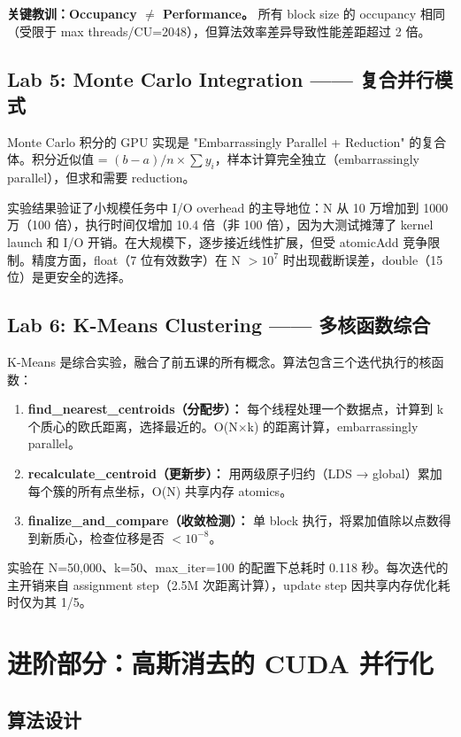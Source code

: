 \documentclass[a4paper]{article}
\begin{document}
\textbf{关键教训：Occupancy $\neq$ Performance。} 所有 block size 的 occupancy 相同（受限于 max threads/CU=2048），但算法效率差异导致性能差距超过 2 倍。

\subsection{Lab 5: Monte Carlo Integration —— 复合并行模式}

Monte Carlo 积分的 GPU 实现是 "Embarrassingly Parallel + Reduction" 的复合体。积分近似值 = $(b-a)/n \times \sum y_i$，样本计算完全独立（embarrassingly parallel），但求和需要 reduction。

实验结果验证了小规模任务中 I/O overhead 的主导地位：N 从 10 万增加到 1000 万（100 倍），执行时间仅增加 10.4 倍（非 100 倍），因为大测试摊薄了 kernel launch 和 I/O 开销。在大规模下，逐步接近线性扩展，但受 atomicAdd 竞争限制。精度方面，float（7 位有效数字）在 N $>10^7$ 时出现截断误差，double（15 位）是更安全的选择。

\subsection{Lab 6: K-Means Clustering —— 多核函数综合}

K-Means 是综合实验，融合了前五课的所有概念。算法包含三个迭代执行的核函数：

\begin{enumerate}
    \item \textbf{find\_nearest\_centroids（分配步）：} 每个线程处理一个数据点，计算到 k 个质心的欧氏距离，选择最近的。O(N$\times$k) 的距离计算，embarrassingly parallel。
    \item \textbf{recalculate\_centroid（更新步）：} 用两级原子归约（LDS → global）累加每个簇的所有点坐标，O(N) 共享内存 atomics。
    \item \textbf{finalize\_and\_compare（收敛检测）：} 单 block 执行，将累加值除以点数得到新质心，检查位移是否 $<10^{-8}$。
\end{enumerate}

实验在 N=50,000、k=50、max\_iter=100 的配置下总耗时 0.118 秒。每次迭代的主开销来自 assignment step（2.5M 次距离计算），update step 因共享内存优化耗时仅为其 1/5。

\section{进阶部分：高斯消去的 CUDA 并行化}

\subsection{算法设计}
\end{document}
